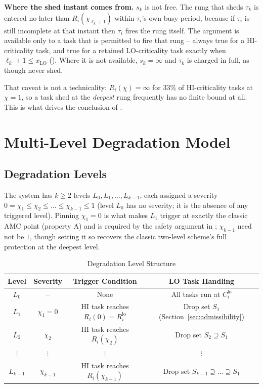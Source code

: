 \textbf{Where the shed instant comes from.} $s_k$ is not free. The rung that
sheds $\tau_k$ is entered no later than $R_i(\chi_{\ell_k + 1})$ within
$\tau_i$'s own busy period, because if $\tau_i$ is still incomplete at that
instant then $\tau_i$ fires the rung itself. The argument is available only to
a task that is permitted to fire that rung -- always true for a HI-criticality
task, and true for a retained LO-criticality task exactly when
$\ell_k + 1 \leq x_{\mathrm{LO}}$ (). Where it is not
available, $s_k = \infty$ and $\tau_k$ is charged in full, as though never shed.

That caveat is not a technicality: $R_i(\chi) = \infty$ for $33\%$ of
HI-criticality tasks at $\chi = 1$, so a task shed at the \emph{deepest} rung
frequently has no finite bound at all. This is what drives the conclusion of
.

\section{Multi-Level Degradation Model}
\label{sec:multilevel}

\subsection{Degradation Levels}

The system has $k \geq 2$ levels $L_0, L_1, \dots, L_{k-1}$, each assigned a
severity $0 = \chi_1 \leq \chi_2 \leq \dots \leq \chi_{k-1} \leq 1$ (level
$L_0$ has no severity; it is the absence of any triggered level). Pinning
$\chi_1 = 0$ is what makes $L_1$ trigger at exactly the classic AMC point
(property A) and is required by the safety argument in
; $\chi_{k-1}$ need not be $1$, though setting it so
recovers the classic two-level scheme's full protection at the deepest level.

\begin{table}[h]
\centering
\caption{Degradation Level Structure}
\begin{tabular}{cccc}
\toprule
Level & Severity & Trigger Condition & LO Task Handling \\
\midrule
$L_0$ & -- & None & All tasks run at $C_i^{\mathrm{lo}}$ \\
$L_1$ & $\chi_1 = 0$ & HI task reaches $R_i(0) = R_i^{\mathrm{lo}}$ & Drop set $S_1$ (Section~\ref{sec:admissibility}) \\
$L_2$ & $\chi_2$ & HI task reaches $R_i(\chi_2)$ & Drop set $S_2 \supseteq S_1$ \\
$\vdots$ & $\vdots$ & $\vdots$ & $\vdots$ \\
$L_{k-1}$ & $\chi_{k-1}$ & HI task reaches $R_i(\chi_{k-1})$ & Drop set $S_{k-1} \supseteq \dots \supseteq S_1$ \\
\bottomrule
\end{tabular}
\end{table}

